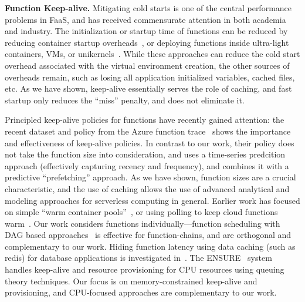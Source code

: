 \label{sec:related}
\vspace*{\subsecspace}


\noindent \textbf{Function Keep-alive.}
Mitigating cold starts is one of the central performance problems in FaaS, and has received commensurate attention in both academia and industry.
%
The initialization or startup time of functions can be reduced  by reducing container startup overheads~\cite{oakes_sock_2018,mohan_agile_2019, akkus_sand_2018}, or deploying functions inside ultra-light containers, VMs, or unikernels~\cite{unikernels,firecracker-nsdi20}.
%
While these approaches can reduce the cold start overhead associated with the virtual environment creation, the other sources of overheads remain, such as losing all application initialized variables, cached files, etc.
As we have shown, keep-alive essentially serves the role of caching, and fast startup only reduces the ``miss'' penalty, and does not eliminate it.


Principled keep-alive policies for functions have recently gained attention: the recent dataset and policy from the Azure function trace~\cite{shahrad_serverless_2020} shows the importance and effectiveness of keep-alive policies. 
In contrast to our work, their policy does not take the function size into consideration, and uses a time-series predcition approach (effectively capturing recency and frequency), and combines it with a predictive ``prefetching'' approach. 
As we have shown, function sizes are a crucial characteristic, and the use of caching allows the use of advanced analytical and modeling approaches for serverless computing in general. 
%
Earlier work has focused on simple ``warm container pools''~\cite{lin_mitigating_2019}, or using polling to keep cloud functions warm~\cite{warm2,warm1}. 
%
Our work considers functions individually---function scheduling with DAG based approaches~\cite{carver_search_2019} is effective for function-chains, and are orthogonal and complementary to our work. 
%
Hiding function latency using data caching (such as redis) for database applications is investigated in~\cite{ghosh_caching_2019}. 
The ENSURE~\cite{ensure_acsos20} system handles keep-alive and resource provisioning for CPU resources using queuing theory techniques.
Our focus is on memory-constrained keep-alive and provisioning, and CPU-focused approaches are complementary to our work. 

